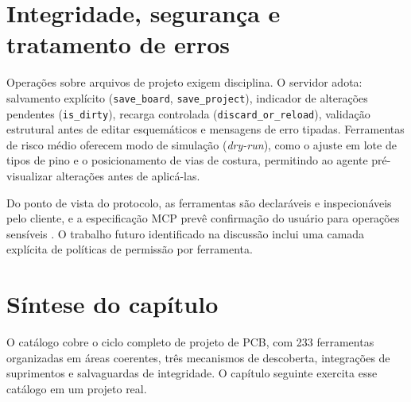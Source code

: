 \section{Integridade, segurança e tratamento de erros}

Operações sobre arquivos de projeto exigem disciplina. O servidor adota:
salvamento explícito (\texttt{save\_board}, \texttt{save\_project}),
indicador de alterações pendentes (\texttt{is\_dirty}), recarga controlada
(\texttt{discard\_or\_reload}), validação estrutural antes de editar
esquemáticos e mensagens de erro tipadas. Ferramentas de risco médio oferecem
modo de simulação (\emph{dry-run}), como o ajuste em lote de tipos de pino e o
posicionamento de vias de costura, permitindo ao agente pré-visualizar
alterações antes de aplicá-las.

Do ponto de vista do protocolo, as ferramentas são declaráveis e inspecionáveis
pelo cliente, e a especificação MCP prevê confirmação do usuário para
operações sensíveis \citep{mcp2025spec}. O trabalho futuro identificado na
discussão inclui uma camada explícita de políticas de permissão por
ferramenta.

\section{Síntese do capítulo}

O catálogo cobre o ciclo completo de projeto de PCB, com 233 ferramentas
organizadas em áreas coerentes, três mecanismos de descoberta, integrações de
suprimentos e salvaguardas de integridade. O capítulo seguinte exercita esse
catálogo em um projeto real.
